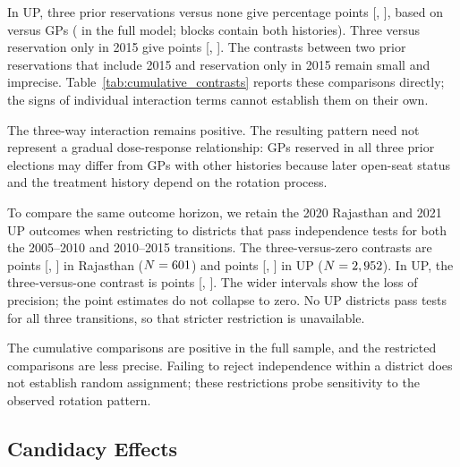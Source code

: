 \documentclass[12pt]{article}
\begin{document}
In UP, three prior reservations versus none give \upFullAlways{} percentage points [\upFullAlwaysLow{}, \upFullAlwaysHigh{}], based on \upFullAlwaysLeftN{} versus \upFullAlwaysRightN{} GPs (\upFullAlwaysN{} in the full model; \upFullAlwaysSharedClusters{} blocks contain both histories). Three versus reservation only in 2015 give \upFullExtra{} points [\upFullExtraLow{}, \upFullExtraHigh{}]. The contrasts between two prior reservations that include 2015 and reservation only in 2015 remain small and imprecise. Table~\ref{tab:cumulative_contrasts} reports these comparisons directly; the signs of individual interaction terms cannot establish them on their own.
 
The three-way interaction remains positive. The resulting pattern need not represent a gradual dose-response relationship: GPs reserved in all three prior elections may differ from GPs with other histories because later open-seat status and the treatment history depend on the rotation process.
 
To compare the same outcome horizon, we retain the 2020 Rajasthan and 2021 UP outcomes when restricting to districts that pass independence tests for both the 2005--2010 and 2010--2015 transitions. The three-versus-zero contrasts are \rajRestrictedAlways{} points [\rajRestrictedAlwaysLow{}, \rajRestrictedAlwaysHigh{}] in Rajasthan ($N=601{}$) and \upRestrictedAlways{} points [\upRestrictedAlwaysLow{}, \upRestrictedAlwaysHigh{}] in UP ($N=2,952{}$). In UP, the three-versus-one contrast is \upRestrictedExtra{} points [\upRestrictedExtraLow{}, \upRestrictedExtraHigh{}]. The wider intervals show the loss of precision; the point estimates do not collapse to zero. No UP districts pass tests for all three transitions, so that stricter restriction is unavailable.
 
The cumulative comparisons are positive in the full sample, and the restricted comparisons are less precise. Failing to reject independence within a district does not establish random assignment; these restrictions probe sensitivity to the observed rotation pattern.
 
\begin{table}[!htbp]
    \centering
    \caption{Cumulative Exposure Effects}
    \label{tab:long_run_interaction}
    
\end{table}


\subsection{Candidacy Effects}
\end{document}
